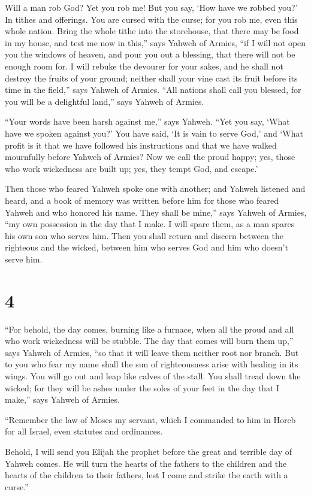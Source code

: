  Will a man rob God? Yet you rob me! But you say, `How have
we robbed you?' In tithes and offerings.  You are cursed
with the curse; for you rob me, even this whole nation. 
Bring the whole tithe into the storehouse, that there may be food in my
house, and test me now in this,'' says Yahweh of Armies, ``if I will not
open you the windows of heaven, and pour you out a blessing, that there
will not be enough room for.  I will rebuke the devourer
for your sakes, and he shall not destroy the fruits of your ground;
neither shall your vine cast its fruit before its time in the field,''
says Yahweh of Armies.  ``All nations shall call you
blessed, for you will be a delightful land,'' says Yahweh of Armies.

 ``Your words have been harsh against me,'' says Yahweh.
``Yet you say, `What have we spoken against you?'  You have
said, `It is vain to serve God,' and `What profit is it that we have
followed his instructions and that we have walked mournfully before
Yahweh of Armies?  Now we call the proud happy; yes, those
who work wickedness are built up; yes, they tempt God, and escape.'

 Then those who feared Yahweh spoke one with another; and
Yahweh listened and heard, and a book of memory was written before him
for those who feared Yahweh and who honored his name.  They
shall be mine,'' says Yahweh of Armies, ``my own possession in the day
that I make. I will spare them, as a man spares his own son who serves
him.  Then you shall return and discern between the
righteous and the wicked, between him who serves God and him who doesn't
serve him.

\hypertarget{section-3}{%
\section{4}\label{section-3}}

 ``For behold, the day comes, burning like a furnace, when
all the proud and all who work wickedness will be stubble. The day that
comes will burn them up,'' says Yahweh of Armies, ``so that it will
leave them neither root nor branch.  But to you who fear my
name shall the sun of righteousness arise with healing in its wings. You
will go out and leap like calves of the stall.  You shall
tread down the wicked; for they will be ashes under the soles of your
feet in the day that I make,'' says Yahweh of Armies.

 ``Remember the law of Moses my servant, which I commanded
to him in Horeb for all Israel, even statutes and ordinances.

 Behold, I will send you Elijah the prophet before the great
and terrible day of Yahweh comes.  He will turn the hearts
of the fathers to the children and the hearts of the children to their
fathers, lest I come and strike the earth with a curse.''
